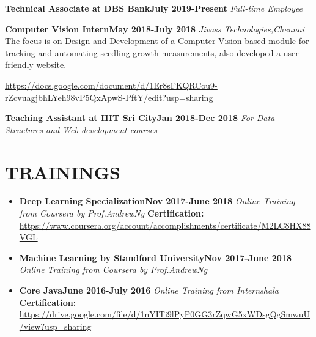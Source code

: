 \documentclass[12pt,a4paper,sans]{moderncv}        %
\begin{document}
{\textbf{Technical Associate at DBS Bank}}\hfill{\textbf{July 2019-Present}}\newline
{\textit{Full-time Employee}}\newline

{\textbf{Computer Vision Intern}}\hfill{\textbf{May 2018-July 2018}}\newline
{\textit{Jivass Technologies,Chennai}}\newline
{\small{The focus is on Design and Development of a Computer Vision based module for tracking and automating seedling growth measurements, also developed a user friendly website. }}

{\color{blue}\url{https://docs.google.com/document/d/1Er8sFKQRCou9-rZcvuagjbhLYeh98vP5QxApwS-PftY/edit?usp=sharing}}\newline

{\textbf{Teaching Assistant at IIIT Sri City}}\hfill{\textbf{Jan 2018-Dec 2018}}\newline
{\textit{For Data Structures and Web development courses}}\newline





\section{TRAININGS}
\begin{itemize}
\item{\textbf{Deep Learning Specialization}}\hfill{\textbf{Nov 2017-June 2018}}\newline
{\textit{Online Training from Coursera by Prof.AndrewNg}}\newline
\textbf{Certification:}\newline
{\color{blue}\url{https://www.coursera.org/account/accomplishments/certificate/M2LC8HX88VGL}}
\item{\textbf{Machine Learning by Standford University}}\hfill{\textbf{Nov 2017-June 2018}}\newline
{\textit{Online Training from Coursera by Prof.AndrewNg}}
\item{\textbf{Core Java}}\hfill{\textbf{June 2016-July 2016}}\newline
{\textit{Online Training from Internshala}}\newline
\textbf{Certification:}\newline
{\color{blue}\url{https://drive.google.com/file/d/1nYITi9lPyP0GG3rZqwG5xWDsgQgSmwuU/view?usp=sharing}}

\end{itemize}
\end{document}
